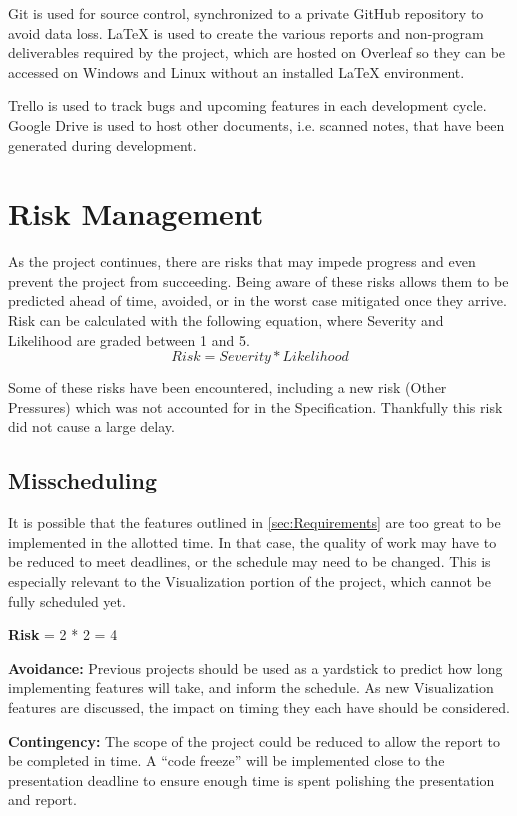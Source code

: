 Git\cite{tool:Git} is used for source control, synchronized to a private GitHub\cite{tool:GitHub} repository to avoid data loss.
\LaTeX{}\cite{tool:Latex} is used to create the various reports and non-program deliverables required by the project, which are hosted on Overleaf\cite{tool:Overleaf} so they can be accessed on Windows and Linux without an installed \LaTeX{} environment.
 
Trello\cite{tool:Trello} is used to track bugs and upcoming features in each development cycle.
Google Drive\cite{tool:GoogleDrive} is used to host other documents, i.e. scanned notes, that have been generated during development.

\section{Risk Management}
As the project continues, there are risks that may impede progress and even prevent the project from succeeding.
Being aware of these risks allows them to be predicted ahead of time, avoided, or in the worst case mitigated once they arrive.
Risk can be calculated with the following equation, where Severity and Likelihood are graded between 1 and 5.
\begin{equation*}
    Risk = Severity * Likelihood
\end{equation*}

Some of these risks have been encountered, including a new risk (Other Pressures) which was not accounted for in the Specification.
Thankfully this risk did not cause a large delay.

\subsection{Misscheduling}
It is possible that the features outlined in \cref{sec:Requirements} are too great to be implemented in the allotted time.
In that case, the quality of work may have to be reduced to meet deadlines, or the schedule may need to be changed.
This is especially relevant to the Visualization portion of the project, which cannot be fully scheduled yet.

\textbf{Risk} = 2 * 2 = 4

\textbf{Avoidance:}
Previous projects should be used as a yardstick to predict how long implementing features will take, and inform the schedule.
As new Visualization features are discussed, the impact on timing they each have should be considered.

\textbf{Contingency:}
The scope of the project could be reduced to allow the report to be completed in time.
A ``code freeze'' will be implemented close to the presentation deadline to ensure enough time is spent polishing the presentation and report.

